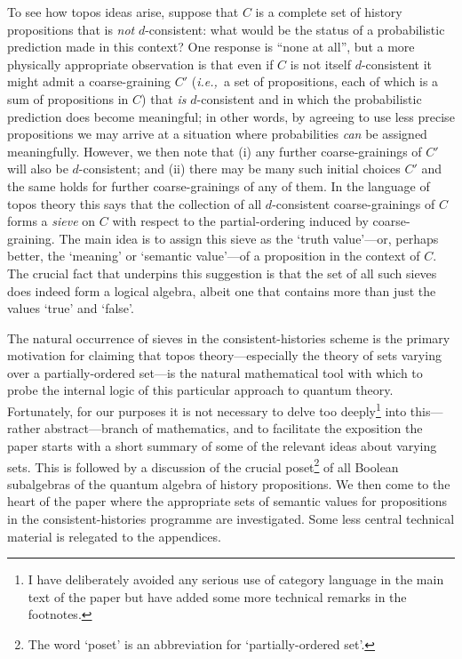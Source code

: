 \documentclass[12pt]{article}
\newcommand{\ie}{{\em i.e.,\ }}
\begin{document}
	To see how topos ideas arise, suppose that $C$ is a complete set
of history propositions that is {\em not\/} $d$-consistent: what
would be the status of a probabilistic prediction made in this
context? One response is ``none at all'', but a more physically
appropriate observation is that even if $C$ is not itself
$d$-consistent it might admit a coarse-graining $C'$ (\ie a set of
propositions, each of which is a sum of propositions in $C$)
that {\em is\/} $d$-consistent and in which the probabilistic
prediction does become meaningful; in other words, by agreeing to
use less precise propositions we may arrive at a situation where
probabilities {\em can\/} be assigned meaningfully.  However, we
then note that (i) any further coarse-grainings of $C'$ will also be
$d$-consistent; and (ii) there may be many such initial choices $C'$
and the same holds for further coarse-grainings of any of them.  In
the language of topos theory this says that the collection of all
$d$-consistent coarse-grainings of $C$ forms a {\em sieve\/} on $C$
with respect to the partial-ordering induced by coarse-graining. The
main idea is to assign this sieve as the `truth value'---or, perhaps
better, the `meaning' or `semantic value'---of a proposition in the
context of $C$. The crucial fact that underpins this suggestion is
that the set of all such sieves does indeed form a logical algebra,
albeit one that contains more than just the values `true' and
`false'.

	The natural occurrence of sieves in the consistent-histories
scheme is the primary motivation for claiming that topos
theory---especially the theory of sets varying over a
partially-ordered set---is the natural mathematical tool with which
to probe the internal logic of this particular approach to quantum
theory.  Fortunately, for our purposes it is not necessary to delve
too deeply\footnote{I have deliberately avoided any serious use of
category language in the main text of the paper but have added some
more technical remarks in the footnotes.} into this---rather
abstract---branch of mathematics, and to facilitate the exposition the
paper starts with a short summary of some of the relevant ideas
about varying sets. This is followed by a discussion of the crucial
poset\footnote{The word `poset' is an abbreviation for
`partially-ordered set'.} of all Boolean subalgebras of the quantum
algebra of history propositions. We then come to the heart of the
paper where the appropriate sets of semantic values for propositions
in the consistent-histories programme are investigated. Some less
central technical material is relegated to the appendices.
\end{document}
